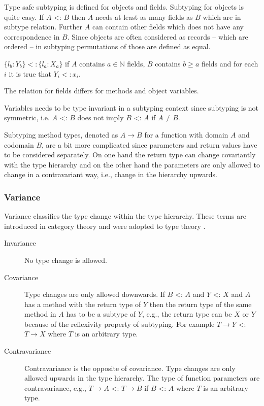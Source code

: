 Type safe subtyping is defined for objects and fields. Subtyping for objects is
quite easy. If $A$ <: $B$ then $A$ needs at least as many fields as $B$
which are in subtype relation. Further $A$ can contain other fields
which does not have any correspondence in $B$. Since objects are often considered
as records -- which are ordered -- in subtyping permutations of those are defined
as equal. 
\begin{defn}
	\label{def:subtypeObject}
	$\{l_b : Y_b\} <: \{l_a : X_a\}$ if $A$ contains $a \in
	\mathbb{N}$ fields, $B$ contains $b \geq a$ fields and for each
	$i$ it is true that $Y_i <: x_i$.
\end{defn}

The relation for fields differs for methods and object variables.

Variables needs to be type invariant in a subtyping context since
subtyping is not symmetric, i.e. $A$ <: $B$ does not imply $B$ <: $A$
if $A \neq B$.

Subtyping method types, denoted as $A \rightarrow B$ for a function with
domain $A$ and codomain $B$, are a bit more complicated since parameters
and return values have to be considered separately. On one hand the return
type can change covariantly with the type hierarchy and on the other hand
the parameters are only allowed to change in a contravariant way, i.e.,
change in the hierarchy upwards.

\begin{defn}
\label{def:methodSubtyping}
	\begin{mathpar}
	\end{mathpar}
\end{defn}

\subsubsection{Variance}
Variance classifies the type change within the type hierarchy. These
terms are introduced in category theory and were adopted to type theory
\cite{pierce_basic_1991}.

\begin{description}
	\item[Invariance] No type change is allowed.
	\item[Covariance] Type changes are only allowed downwards. If $B$
	<: $A$ and $Y$ <: $X$ and $A$ has a method with the return
	type of $Y$ then the return type of the same method in $A$
	has to be a subtype of $Y$, e.g., the return type can be $X$
	or $Y$ because of the reflexivity property of subtyping. For
	example $T \rightarrow Y$ <: $T \rightarrow X$ where $T$ is an 
	arbitrary type.
	\item[Contravariance] Contravariance is the opposite of
	covariance. Type changes are only allowed upwards in the type
	hierarchy. The type of function parameters are contravariance,
	e.g., $T \rightarrow A$ <: $T \rightarrow B$ if $B$ <: $A$ where
	$T$ is an arbitrary type.
\end{description}


